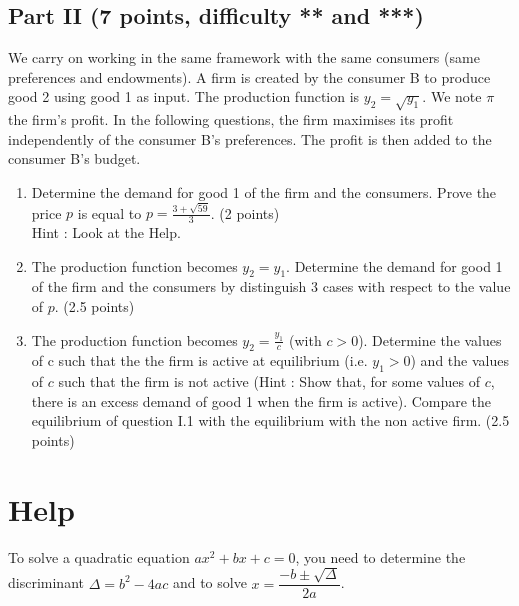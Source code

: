\documentclass[11pt]{article} %
\begin{document}
\subsection*{Part II {\small (7 points, difficulty ** and ***)}}
We carry on working in the same framework with the same consumers (same preferences and endowments). A firm is created by the consumer B to produce good 2 using good 1 as input. The production function is $y_2 = \sqrt{y_1}$. We note $\pi$ the firm's profit. In the following questions, the firm maximises its profit independently of the consumer B's preferences. The profit is then added to the consumer B's budget.

\begin{enumerate}

\item Determine the demand for good 1 of the firm and the consumers. Prove the price $p$ is equal to $p =\frac{3+\sqrt{59}}{3}$. (2 points) \\
Hint : Look at the Help.
\item The production function becomes $y_2 = y_1$. Determine the demand for good 1 of the firm and the consumers by distinguish 3 cases with respect to the value of $p$. (2.5 points)
\item The production function becomes $y_2 = \frac{y_1}{c}$ (with $c>0$). Determine the values of c such that the the firm is active at equilibrium (i.e. $y_1 > 0$) and the values of $c$ such that the firm is not active (Hint : Show that, for some values of $c$, there is
an excess demand of good 1 when the firm is active). Compare the equilibrium of question I.1 with the equilibrium with the non active firm. (2.5 points)

\end{enumerate}

\section*{Help}
To solve a quadratic equation $ax^2 + bx + c = 0 $, you need to determine the discriminant $\Delta = b^2 - 4 ac $ and to solve $x = \dfrac{-b \pm \sqrt{\Delta}}{2a} $.

 
\end{document}
